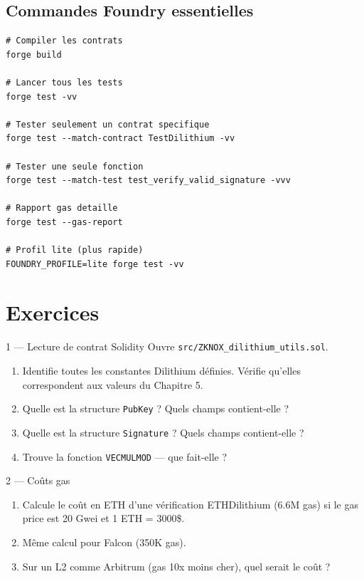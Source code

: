 \documentclass[12pt, a4paper]{article}
\begin{document}
\subsection{Commandes Foundry essentielles}

\begin{lstlisting}[style=bash]
# Compiler les contrats
forge build

# Lancer tous les tests
forge test -vv

# Tester seulement un contrat specifique
forge test --match-contract TestDilithium -vv

# Tester une seule fonction
forge test --match-test test_verify_valid_signature -vvv

# Rapport gas detaille
forge test --gas-report

# Profil lite (plus rapide)
FOUNDRY_PROFILE=lite forge test -vv
\end{lstlisting}

\section{Exercices}

\begin{exercice}{1 --- Lecture de contrat Solidity}
Ouvre \texttt{src/ZKNOX\_dilithium\_utils.sol}.
\begin{enumerate}[label=\alph*)]
  \item Identifie toutes les constantes Dilithium définies.
        Vérifie qu'elles correspondent aux valeurs du Chapitre 5.
  \item Quelle est la structure \texttt{PubKey} ? Quels champs contient-elle ?
  \item Quelle est la structure \texttt{Signature} ? Quels champs contient-elle ?
  \item Trouve la fonction \texttt{VECMULMOD} --- que fait-elle ?
\end{enumerate}
\end{exercice}

\begin{exercice}{2 --- Coûts gas}
\begin{enumerate}[label=\alph*)]
  \item Calcule le coût en ETH d'une vérification ETHDilithium (6.6M gas)
        si le gas price est 20 Gwei et 1 ETH = 3000\$.
  \item Même calcul pour Falcon (350K gas).
  \item Sur un L2 comme Arbitrum (gas 10x moins cher), quel serait le coût ?
\end{enumerate}
\end{exercice}
\end{document}
